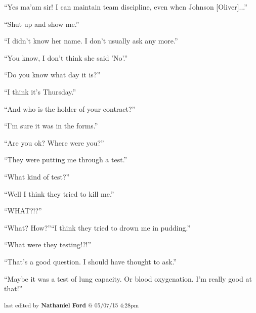 


``Yes ma'am sir! I can maintain team discipline, even when Johnson {[}Oliver{]}...''

``Shut up and show me.''




``I didn't know her name.  I don't usually ask any more.''




``You know, I don't think she said 'No'.''




``Do you know what day it is?''

``I think it's Thursday.''

``And who is the holder of your contract?''

``I'm sure it was in the forms.''




``Are you ok?  Where were you?''

``They were putting me through a test.''

``What kind of test?''

``Well I think they tried to kill me.''

``WHAT?!?''




``What?  How?''``I think they tried to drown me in pudding.''

``What were they testing!?!''

``That's a good question.  I should have thought to ask.''




``Maybe it was a test of lung capacity.  Or blood oxygenation.  I'm really good at that!''



\vspace{\fill}

\begin{flushright}
\textsubscript{last edited by \textbf{Nathaniel Ford} @ 05/07/15 4:28pm}
\end{flushright}
